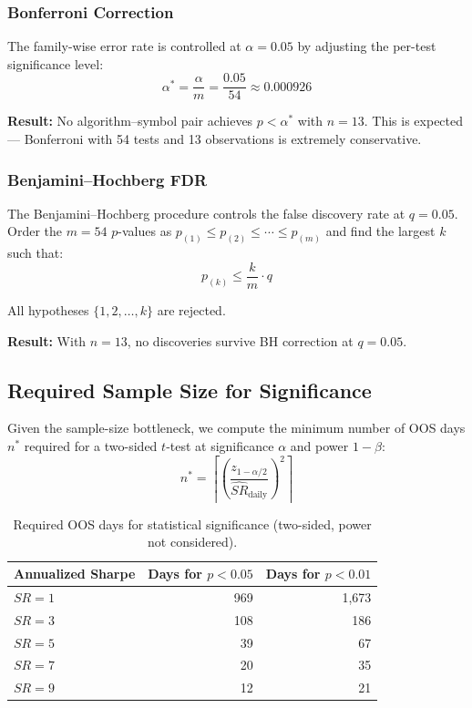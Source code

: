 \documentclass[11pt,a4paper]{article}
\newcommand{\toprule}{\hline\hline}
\newcommand{\midrule}{\hline}
\newcommand{\bottomrule}{\hline\hline}
\begin{document}
\subsubsection*{Bonferroni Correction}

The family-wise error rate is controlled at $\alpha = 0.05$ by adjusting the per-test significance level:
\begin{equation}
\alpha^* = \frac{\alpha}{m} = \frac{0.05}{54} \approx 0.000926
\end{equation}

\textbf{Result:} No algorithm--symbol pair achieves $p < \alpha^*$ with $n = 13$. This is expected --- Bonferroni with 54 tests and 13 observations is extremely conservative.

\subsubsection*{Benjamini--Hochberg FDR}

The Benjamini--Hochberg procedure controls the false discovery rate at $q = 0.05$. Order the $m = 54$ $p$-values as $p_{(1)} \leq p_{(2)} \leq \cdots \leq p_{(m)}$ and find the largest $k$ such that:
\begin{equation}
p_{(k)} \leq \frac{k}{m} \cdot q
\end{equation}

All hypotheses $\{1, 2, \ldots, k\}$ are rejected.

\textbf{Result:} With $n = 13$, no discoveries survive BH correction at $q = 0.05$.

\subsection{Required Sample Size for Significance}

Given the sample-size bottleneck, we compute the minimum number of OOS days $n^*$ required for a two-sided $t$-test at significance $\alpha$ and power $1-\beta$:
\begin{equation}
n^* = \left\lceil \left(\frac{z_{1-\alpha/2}}{\widehat{SR}_{\text{daily}}}\right)^2 \right\rceil
\end{equation}

\begin{table}[h!]
\centering
\caption{Required OOS days for statistical significance (two-sided, power not considered).}
\label{tab:required_n}
\begin{tabular}{@{}lrr@{}}
\toprule
Annualized Sharpe & Days for $p < 0.05$ & Days for $p < 0.01$ \\
\midrule
$SR = 1$ & 969 & 1{,}673 \\
$SR = 3$ & 108 & 186 \\
$SR = 5$ & 39 & 67 \\
$SR = 7$ & 20 & 35 \\
$SR = 9$ & 12 & 21 \\
\bottomrule
\end{tabular}
\end{table}
\end{document}
